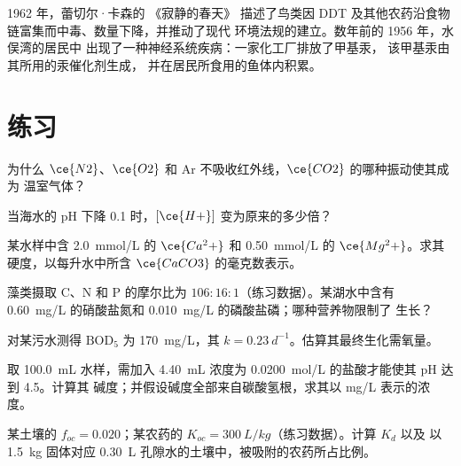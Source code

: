 \begin{history}[一本书与一个海湾]
1962 年，蕾切尔·卡森的 《寂静的春天》 描述了鸟类因
DDT 及其他农药沿食物链富集而中毒、数量下降，并推动了现代
环境法规的建立。数年前的 1956 年，水俣湾的居民中
出现了一种神经系统疾病：一家化工厂排放了甲基汞，
该甲基汞由其所用的汞催化剂生成，
并在居民所食用的鱼体内积累。
\end{history}

\section{练习}

\begin{exercise}[$\star$]\label{exo:b3:environmental-toxicology:1}
为什么 $\ce{N2}$、$\ce{O2}$ 和 Ar 不吸收红外线，$\ce{CO2}$ 的哪种振动使其成为
温室气体？
\end{exercise}

\begin{exercise}[$\star$]\label{exo:b3:environmental-toxicology:2}
当海水的 pH 下降 0.1 时，$[\ce{H+}]$ 变为原来的多少倍？
\end{exercise}

\begin{exercise}[$\star$]\label{exo:b3:environmental-toxicology:3}
某水样中含 \qty{2.0}{mmol/L} 的 $\ce{Ca^2+}$ 和 \qty{0.50}{mmol/L} 的 $\ce{Mg^2+}$。求其硬度，以每升水中所含 $\ce{CaCO3}$ 的毫克数表示。
\end{exercise}

\begin{exercise}[$\star$]\label{exo:b3:environmental-toxicology:4}
藻类摄取 C、N 和 P 的摩尔比为 $106 : 16 : 1$（练习数据）。某湖水中含有
\qty{0.60}{mg/L} 的硝酸盐氮和 \qty{0.010}{mg/L} 的磷酸盐磷；哪种营养物限制了
生长？
\end{exercise}

\begin{exercise}[$\star\star$]\label{exo:b3:environmental-toxicology:5}
对某污水测得 $\mathrm{BOD_5}$ 为 \qty{170}{mg/L}，其 $k = \qty{0.23}{d^{-1}}$。估算其最终生化需氧量。
\end{exercise}

\begin{exercise}[$\star\star$]\label{exo:b3:environmental-toxicology:6}
取 \qty{100.0}{mL} 水样，需加入 \qty{4.40}{mL} 浓度为 \qty{0.0200}{mol/L} 的盐酸才能使其 pH 达到 4.5。计算其
碱度；并假设碱度全部来自碳酸氢根，求其以 mg/L 表示的浓度。
\end{exercise}

\begin{exercise}[$\star\star$]\label{exo:b3:environmental-toxicology:7}
某土壤的 $f_{oc} = 0.020$；某农药的 $K_{oc} = \qty{300}{L/kg}$（练习数据）。计算 $K_d$ 以及
以 \qty{1.5}{kg} 固体对应 \qty{0.30}{L} 孔隙水的土壤中，被吸附的农药所占比例。
\end{exercise}


